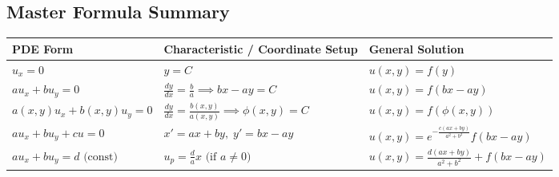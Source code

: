 \documentclass[11pt]{article}
\begin{document}
\subsection{Master Formula Summary}
\begin{center}
\renewcommand{\arraystretch}{1.8}
\begin{tabular}{|l|l|l|}
\hline
\textbf{PDE Form} & \textbf{Characteristic / Coordinate Setup} & \textbf{General Solution} \\ \hline
$u_x = 0$ & $y = C$ & $u(x, y) = f(y)$ \\ \hline
$au_x + bu_y = 0$ & $\frac{dy}{dx} = \frac{b}{a} \implies bx - ay = C$ & $u(x, y) = f(bx - ay)$ \\ \hline
$a(x,y)u_x + b(x,y)u_y = 0$ & $\frac{dy}{dx} = \frac{b(x,y)}{a(x,y)} \implies \phi(x, y) = C$ & $u(x, y) = f(\phi(x, y))$ \\ \hline
$au_x + bu_y + cu = 0$ & $x' = ax+by, \; y' = bx-ay$ & $u(x,y) = e^{-\frac{c(ax+by)}{a^2+b^2}}f(bx - ay)$ \\ \hline
$au_x + bu_y = d \text{ (const)}$ & $u_p = \frac{d}{a}x \text{ (if } a \neq 0\text{)}$ & $u(x,y) = \frac{d(ax+by)}{a^2+b^2} + f(bx - ay)$ \\ \hline
\end{tabular}
\end{center}
\end{document}
